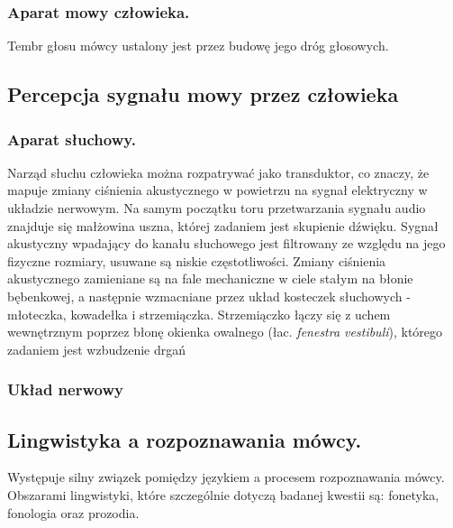 \subsubsection{Aparat mowy człowieka.}
Tembr głosu mówcy ustalony jest przez budowę jego dróg głosowych.

\subsection{Percepcja sygnału mowy przez człowieka}

\subsubsection{Aparat słuchowy.}
Narząd słuchu człowieka można rozpatrywać jako transduktor, co znaczy, że mapuje zmiany ciśnienia akustycznego w powietrzu na sygnał elektryczny w układzie nerwowym. Na samym początku toru przetwarzania sygnału audio znajduje się małżowina uszna, której zadaniem jest skupienie dźwięku. Sygnał akustyczny wpadający do kanału słuchowego jest filtrowany ze względu na jego fizyczne rozmiary, usuwane są niskie częstotliwości. Zmiany ciśnienia akustycznego zamieniane są na fale mechaniczne w ciele stałym na błonie bębenkowej, a następnie wzmacniane przez układ kosteczek słuchowych - młoteczka, kowadełka i strzemiączka. Strzemiączko łączy się z uchem wewnętrznym poprzez błonę okienka owalnego (łac. \textit{fenestra vestibuli}), którego zadaniem jest wzbudzenie drgań %

\subsubsection{Układ nerwowy}

\subsection{Lingwistyka a rozpoznawania mówcy.}

Występuje silny związek pomiędzy językiem a procesem rozpoznawania mówcy. Obszarami lingwistyki, które szczególnie dotyczą badanej kwestii są: fonetyka, fonologia oraz prozodia.

